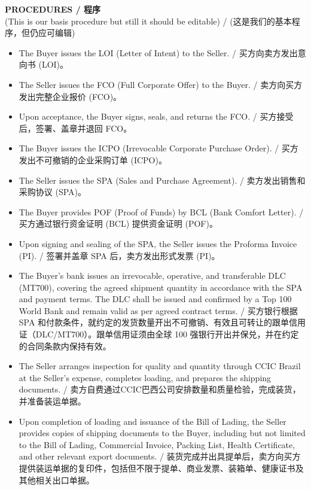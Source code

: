 \documentclass[a4paper,11pt]{article}
\begin{document}
\vspace{0.3cm}
\begin{center}
  {\large\textbf{\color{marooncolor}PROCEDURES / 程序}}\\[4pt]
  {\small\color{marooncolor}(This is our basis procedure but still it should be editable) / (这是我们的基本程序，但仍应可编辑)}
\end{center}
\vspace{0.1cm}
\begin{itemize}[leftmargin=1.5em, itemsep=3pt, topsep=2pt]
\item The Buyer issues the LOI (Letter of Intent) to the Seller. / 买方向卖方发出意向书 (LOI)。
\item The Seller issues the FCO (Full Corporate Offer) to the Buyer. / 卖方向买方发出完整企业报价 (FCO)。
\item Upon acceptance, the Buyer signs, seals, and returns the FCO. / 买方接受后，签署、盖章并退回 FCO。
\item The Buyer issues the ICPO (Irrevocable Corporate Purchase Order). / 买方发出不可撤销的企业采购订单 (ICPO)。
\item The Seller issues the SPA (Sales and Purchase Agreement). / 卖方发出销售和采购协议 (SPA)。
\item The Buyer provides POF (Proof of Funds) by BCL (Bank Comfort Letter). / 买方通过银行资金证明 (BCL) 提供资金证明 (POF)。
\item Upon signing and sealing of the SPA, the Seller issues the Proforma Invoice (PI). / 签署并盖章 SPA 后，卖方发出形式发票 (PI)。
\item The Buyer's bank issues an irrevocable, operative, and transferable DLC (MT700), covering the agreed shipment quantity in accordance with the SPA and payment terms. The DLC shall be issued and confirmed by a Top 100 World Bank and remain valid as per agreed contract terms. / 买方银行根据 SPA 和付款条件，就约定的发货数量开出不可撤销、有效且可转让的跟单信用证（DLC/MT700）。跟单信用证须由全球 100 强银行开出并保兑，并在约定的合同条款内保持有效。
\item The Seller arranges inspection for quality and quantity through CCIC Brazil at the Seller's expense, completes loading, and prepares the shipping documents. / 卖方自费通过CCIC巴西公司安排数量和质量检验，完成装货，并准备装运单据。
\item Upon completion of loading and issuance of the Bill of Lading, the Seller provides copies of shipping documents to the Buyer, including but not limited to the Bill of Lading, Commercial Invoice, Packing List, Health Certificate, and other relevant export documents. / 装货完成并出具提单后，卖方向买方提供装运单据的复印件，包括但不限于提单、商业发票、装箱单、健康证书及其他相关出口单据。

\end{itemize}
\end{document}
